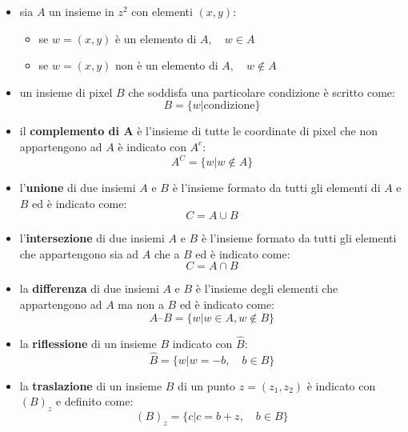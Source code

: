 \begin{itemize}
	\item sia $A$ un insieme in $z^2$ con elementi $(x, y)$:
	\begin{itemize}
		\item se $w = (x, y)$ è un elemento di $A, \quad w \in A$
		\item se $w = (x, y)$ non è un elemento di $A, \quad w \notin A$
	\end{itemize}
	
	\item un insieme di pixel $B$ che soddisfa una particolare condizione è scritto come:
	$$
	B = \{w | \text{condizione}\}
	$$
	
	\item il \textbf{complemento di A} è l'insieme di tutte le coordinate di pixel che non appartengono ad $A$ è indicato con $A^c$:
	$$
	A^C = \{w | w \notin A \}
	$$
	
	\item l'\textbf{unione} di due insiemi $A$ e $B$ è l'insieme formato da tutti gli elementi di $A$ e $B$ ed è indicato come:
	$$
	C = A \cup B
	$$
	
	\item l'\textbf{intersezione} di due insiemi $A$ e $B$ è l'insieme formato da tutti gli elementi che appartengono sia ad $A$ che a $B$ ed è indicato come:
	$$
	C = A \cap B
	$$
	
	\item la \textbf{differenza} di due insiemi $A$ e $B$ è l'insieme degli elementi che appartengono ad $A$ ma non a $B$ ed è indicato come:
	$$
	A – B = \{w | w \in A, w \notin B\}
	$$
	
	\item la \textbf{riflessione} di un insieme $B$ indicato con $\hat B$:
	$$
	\hat B = \{w | w = -b, \quad b \in B\}
	$$
	
	\item la \textbf{traslazione} di un insieme $B$ di un punto $z =(z_1, z_2)$ è indicato con $(B)_z$ e definito come:
	$$
	(B)_z = \{c|c= b + z, \quad b \in B \}
	$$
\end{itemize}

